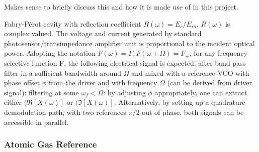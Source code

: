 Makes sense to briefly discuss this and how it is made use of in this project.

Fabry-P{\'e}rot cavity with reflection coefficient $R(\omega)=E_{r}/E_{in}$.
$R(\omega)$ is complex valued. The voltage and current generated by standard photosensor/transimpedance amplifier unit is proportional to the incident optical power. Adopting the notation $F(\omega) = F, F(\omega \pm \Omega) = F_\pm$, for any frequency selective function F, the following electrical signal is expected:
after band pass filter in a sufficient bandwidth around $\Omega$ and mixed with a reference VCO with phase offset $\phi$ from the driver and with frequency $\Omega$ (can be derived from driver signal):
filtering at some $\omega_f < \Omega$:
by adjusting $\phi$ appropriately, one can extract either $(\Re[X(\omega)]$ or $(\Im[X(\omega)]$. Alternatively, by setting up a quadrature demodulation path, with two references $\pi/2$ out of phase, both signals can be accessible in parallel.

\subsubsection{Atomic Gas Reference}

